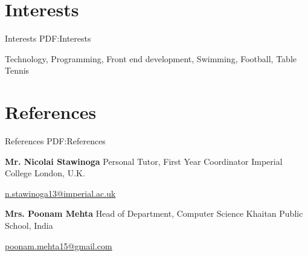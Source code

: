 \documentclass[letterpaper,10pt,oneside]{article}
\begin{document}
\begin{body}

\section
{Interests}
{Interests}
{PDF:Interests}

Technology, Programming,
\newline
Front end development,
\newline
Swimming, Football, Table Tennis


\section
{References}
{References}
{PDF:References}

\BulletItem
\textbf{Mr. Nicolai Stawinoga}
\newline
Personal Tutor, First Year Coordinator
\newline
Imperial College London, U.K.
\begin{detail}
\SubItem
\href{mailto:n.stawinoga13@imperial.ac.uk}
{n.stawinoga13@imperial.ac.uk}
\,
\end{detail}

\GapNoBreak

\BulletItem
\textbf{Mrs. Poonam Mehta}
\newline
Head of Department, Computer Science
\newline
Khaitan Public School, India
\begin{detail}
\SubItem
\href{mailto:poonam.mehta15@gmail.com}
{poonam.mehta15@gmail.com}
\,
\end{detail}

\end{body}

\label{LastPage}~
\end{document}
